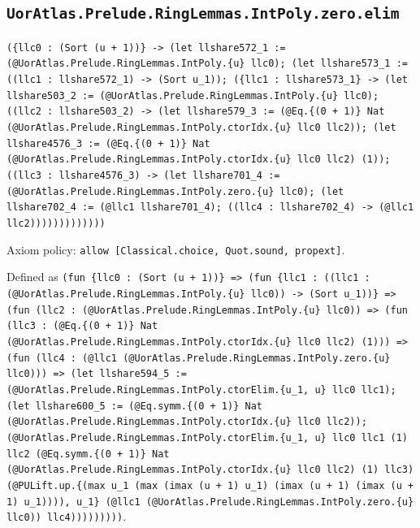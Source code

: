\documentclass[11pt]{article}
\begin{document}
\subsection*{\texttt{UorAtlas.Prelude.RingLemmas.IntPoly.zero.elim}}
\noindent\texttt{(\{llc0 : (Sort (u + 1))\} -> (let llshare572\_1 := (@UorAtlas.Prelude.RingLemmas.IntPoly.\{u\} llc0); (let llshare573\_1 := ((llc1 : llshare572\_1) -> (Sort u\_1)); (\{llc1 : llshare573\_1\} -> (let llshare503\_2 := (@UorAtlas.Prelude.RingLemmas.IntPoly.\{u\} llc0); ((llc2 : llshare503\_2) -> (let llshare579\_3 := (@Eq.\{(0 + 1)\} Nat (@UorAtlas.Prelude.RingLemmas.IntPoly.ctorIdx.\{u\} llc0 llc2)); (let llshare4576\_3 := (@Eq.\{(0 + 1)\} Nat (@UorAtlas.Prelude.RingLemmas.IntPoly.ctorIdx.\{u\} llc0 llc2) (1)); ((llc3 : llshare4576\_3) -> (let llshare701\_4 := (@UorAtlas.Prelude.RingLemmas.IntPoly.zero.\{u\} llc0); (let llshare702\_4 := (@llc1 llshare701\_4); ((llc4 : llshare702\_4) -> (@llc1 llc2)))))))))))))}\par
\noindent Axiom policy: \texttt{allow [Classical.choice, Quot.sound, propext]}.\par
\noindent Defined as \texttt{(fun \{llc0 : (Sort (u + 1))\} => (fun \{llc1 : ((llc1 : (@UorAtlas.Prelude.RingLemmas.IntPoly.\{u\} llc0)) -> (Sort u\_1))\} => (fun (llc2 : (@UorAtlas.Prelude.RingLemmas.IntPoly.\{u\} llc0)) => (fun (llc3 : (@Eq.\{(0 + 1)\} Nat (@UorAtlas.Prelude.RingLemmas.IntPoly.ctorIdx.\{u\} llc0 llc2) (1))) => (fun (llc4 : (@llc1 (@UorAtlas.Prelude.RingLemmas.IntPoly.zero.\{u\} llc0))) => (let llshare594\_5 := (@UorAtlas.Prelude.RingLemmas.IntPoly.ctorElim.\{u\_1, u\} llc0 llc1); (let llshare600\_5 := (@Eq.symm.\{(0 + 1)\} Nat (@UorAtlas.Prelude.RingLemmas.IntPoly.ctorIdx.\{u\} llc0 llc2)); (@UorAtlas.Prelude.RingLemmas.IntPoly.ctorElim.\{u\_1, u\} llc0 llc1 (1) llc2 (@Eq.symm.\{(0 + 1)\} Nat (@UorAtlas.Prelude.RingLemmas.IntPoly.ctorIdx.\{u\} llc0 llc2) (1) llc3) (@PULift.up.\{(max u\_1 (max (imax (u + 1) u\_1) (imax (u + 1) (imax (u + 1) u\_1)))), u\_1\} (@llc1 (@UorAtlas.Prelude.RingLemmas.IntPoly.zero.\{u\} llc0)) llc4)))))))))}.\par
\end{document}
